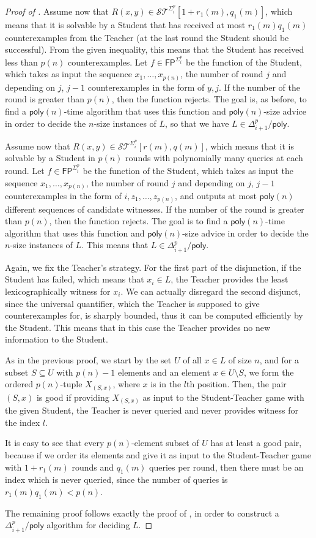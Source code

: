 \documentclass[11pt]{article}
\newcommand{\poly}{\mathsf{poly}}
\newcommand{\FP}{\mathsf{FP}}
\theoremstyle{definition}
\theoremstyle{definition}
\theoremstyle{remark}
\begin{document}
\begin{proof}[Proof of ]
    Assume now that $R(x,y)\in \mathcal{ST}^{\Sigma^p_i}[1+r_1(m),q_1(m)]$, which means that it is solvable by a Student that has received at most $r_1(m)q_1(m)$ counterexamples from the Teacher (at the last round the Student should be successful). From the given inequality, this means that the Student has received less than $p(n)$ counterexamples. Let $f\in \FP^{\Sigma^p_i}$ be the function of the Student, which takes as input the sequence $x_1,\dots,x_{p(n)}$, the number of round $j$ and depending on $j$, $j-1$ counterexamples in the form of $y,j$. If the number of the round is greater than $p(n)$, then the function rejects. The goal is, as before, to find a $\poly(n)$-time algorithm that uses this function and $\poly(n)$-size advice in order to decide the $n$-size instances of $L$, so that we have $L\in \Delta^p_{i+1}/\poly$.

    Assume now that $R(x,y)\in \mathcal{ST}^{\Sigma^p_i}[r(m),q(m)]$, which means that it is solvable by a Student in $p(n)$ rounds with polynomially many queries at each round. Let $f\in \FP^{\Sigma^p_i}$ be the function of the Student, which takes as input the sequence $x_1,\dots,x_{p(n)}$, the number of round $j$ and depending on $j$, $j-1$ counterexamples in the form of $i,z_1,\dots,z_{p(n)}$, and outputs at most $\poly(n)$ different sequences of candidate witnesses. If the number of the round is greater than $p(n)$, then the function rejects. The goal is to find a $\poly(n)$-time algorithm that uses this function and $\poly(n)$-size advice in order to decide the $n$-size instances of $L$. This means that $L\in \Delta^p_{i+1}/\poly$.


    Again, we fix the Teacher's strategy. For the first part of the disjunction, if the Student has failed, which means that $x_i\in L$, the Teacher provides the least lexicographically witness for $x_i$. We can actually disregard the second disjunct, since the universal quantifier, which the Teacher is supposed to give counterexamples for, is sharply bounded, thus it can be computed efficiently by the Student. This means that in this case the Teacher provides no new information to the Student.

    As in the previous proof, we start by the set $U$ of all $x\in L$ of size $n$, and for a subset $S\subseteq U$ with $p(n)-1$ elements and an element $x\in U\setminus S$, we form the ordered $p(n)$-tuple $X_{(S,x)}$, where $x$ is in the $l$th position. Then, the pair $(S,x)$ is good if providing $X_{(S,x)}$ as input to the Student-Teacher game with the given Student, the Teacher is never queried and never provides witness for the index $l$.

    It is easy to see that every $p(n)$-element subset of $U$ has at least a good pair, because if we order its elements and give it as input to the Student-Teacher game with $1+r_1(m)$ rounds and $q_1(m)$ queries per round, then there must be an index which is never queried, since the number of queries is $r_1(m)q_1(m)<p(n)$.

    The remaining proof follows exactly the proof of , in order to construct a $\Delta^p_{i+1}/\poly$ algorithm for deciding $L$.
\end{proof}
    
\end{document}
